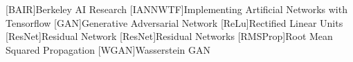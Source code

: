 \documentclass[fleqn,10pt]{SelfArx} %
\begin{document}





\begin{acronym}
[BAIR]{Berkeley AI Research}
[IANNWTF]{Implementing Artificial Networks with Tensorflow}
[GAN]{Generative Adversarial Network}
[ReLu]{Rectified Linear Units}
[ResNet]{Residual Network}
[ResNet]{Residual Networks}
[RMSProp]{Root Mean Squared Propagation}
[WGAN]{Wasserstein \ac{GAN}}
\end{acronym}

\end{document}
